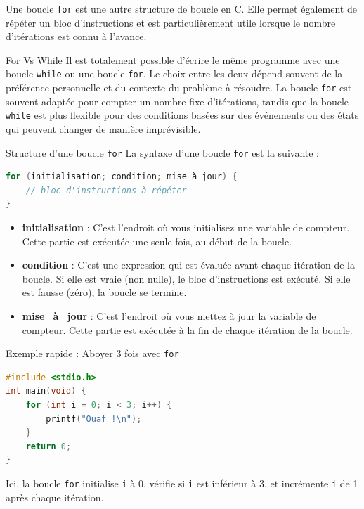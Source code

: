 Une boucle \texttt{for} est une autre structure de boucle en C. Elle permet également de répéter un bloc d'instructions et est particulièrement utile lorsque le nombre d'itérations est connu à l'avance.

\begin{UPSTIinfor}{For Vs While}
	Il est totalement possible d'écrire le même programme avec une boucle \texttt{while} ou une boucle \texttt{for}. Le choix entre les deux dépend souvent de la préférence personnelle et du contexte du problème à résoudre.
	La boucle \texttt{for} est souvent adaptée pour compter un nombre fixe d'itérations, tandis que la boucle \texttt{while} est plus flexible pour des conditions basées sur des événements ou des états qui peuvent changer de manière imprévisible.
\end{UPSTIinfor}

\begin{UPSTIinfor}{Structure d'une boucle \texttt{for}}
	La syntaxe d'une boucle \texttt{for} est la suivante :
	\begin{lstlisting}[language=c]
for (initialisation; condition; mise_à_jour) {
    // bloc d'instructions à répéter
}
\end{lstlisting}
	\begin{itemize}
		\item \textbf{initialisation} : C'est l'endroit où vous initialisez une variable de compteur. Cette partie est exécutée une seule fois, au début de la boucle.
		\item \textbf{condition} : C'est une expression qui est évaluée avant chaque itération de la boucle. Si elle est vraie (non nulle), le bloc d'instructions est exécuté. Si elle est fausse (zéro), la boucle se termine.
		\item \textbf{mise\_à\_jour} : C'est l'endroit où vous mettez à jour la variable de compteur. Cette partie est exécutée à la fin de chaque itération de la boucle.
	\end{itemize}
\end{UPSTIinfor}

\begin{UPSTIinfor}{Exemple rapide : Aboyer 3 fois avec \texttt{for}}
	\begin{lstlisting}[language=c]
#include <stdio.h>
int main(void) {
    for (int i = 0; i < 3; i++) {
        printf("Ouaf !\n");
    }
    return 0;
}
\end{lstlisting}
	Ici, la boucle \texttt{for} initialise \texttt{i} à 0, vérifie si \texttt{i} est inférieur à 3, et incrémente \texttt{i} de 1 après chaque itération.
\end{UPSTIinfor}

